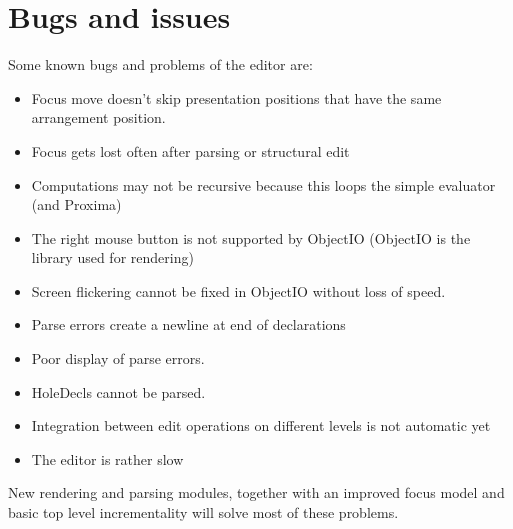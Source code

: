 \documentclass{article}
\begin{document}
\section{Bugs and issues}

\noindent Some known bugs and problems of the editor are:

\begin{itemize}
\item Focus move doesn't skip presentation positions that have the same arrangement position.
\item Focus gets lost often after parsing or structural edit
\item Computations may not be recursive because this loops the simple evaluator (and Proxima)
\item The right mouse button is not supported by ObjectIO (ObjectIO is the library used for rendering)
\item Screen flickering cannot be fixed in ObjectIO without loss of speed.
\item Parse errors create a newline at end of declarations 
\item Poor display of parse errors.
\item HoleDecls cannot be parsed.
\item Integration between edit operations on different levels is not automatic yet
\item The editor is rather slow
\end{itemize}

New rendering and parsing modules, together with an improved focus model and basic top level incrementality will solve most of these problems.
\end{document}
